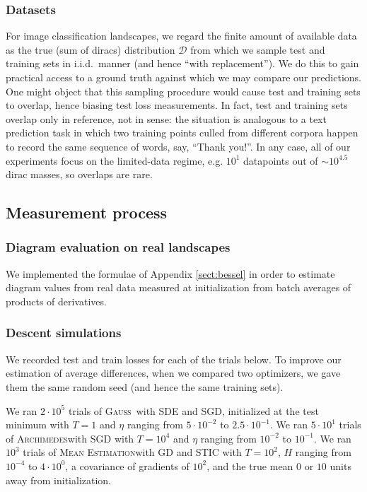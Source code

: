 \documentclass{article}
\theoremstyle{plain}
\theoremstyle{definition}
\newcommand{\Dd}{\mathcal{D}}
\newcommand{\Gauss}{\textsc{Gauss}}
\newcommand{\Archimedes}{\textsc{Archimedes}}
\newcommand{\MeanEstimation}{\textsc{Mean Estimation}}
\begin{document}
        \subsubsection*{Datasets}
            For image classification landscapes, we regard the finite amount of
            available data as the true (sum of diracs) distribution $\Dd$ from
            which we sample test and training sets in i.i.d.\ manner (and hence
            ``with replacement'').  We do this to gain practical access to a
            ground truth against which we may compare our predictions.  One
            might object that this sampling procedure would cause test and
            training sets to overlap, hence biasing test loss measurements.  In
            fact, test and training sets overlap only in reference, not in
            sense: the situation is analogous to a text prediction task in
            which two training points culled from different corpora happen to
            record the same sequence of words, say, ``Thank you!''.  In any
            case, all of our experiments focus on the limited-data regime, e.g.
            $10^1$ datapoints out of $\sim 10^{4.5}$ dirac masses, so overlaps
            are rare.

    \subsection{Measurement process}                                \label{appendix:measure}

        \subsubsection*{Diagram evaluation on real landscapes}
            We implemented the formulae of Appendix \ref{sect:bessel} in order
            to estimate diagram values from real data measured at
            initialization from batch averages of products of derivatives.

        \subsubsection*{Descent simulations}
            We recorded test and train losses for each of the trials below.  To
            improve our estimation of average differences, when we compared two
            optimizers, we gave them the same random seed (and hence the same
            training sets).

            We ran $2 \cdot 10^5$ trials of \Gauss\, with SDE and SGD,
            initialized at the test minimum with $T=1$ and $\eta$ ranging from
            $5\cdot 10^{-2}$ to $2.5\cdot 10^{-1}$.
            We ran $5 \cdot 10^1$ trials of \Archimedes with SGD with $T=10^4$
            and $\eta$ ranging from $10^{-2}$ to $10^{-1}$.
            We ran $10^3$ trials of \MeanEstimation with GD and STIC
            with $T=10^2$, $H$ ranging from $10^{-4}$ to $4 \cdot 10^0$,
            a covariance of gradients of $10^2$, and the true mean $0$ or
            $10$ units away from initialization.
\end{document}
